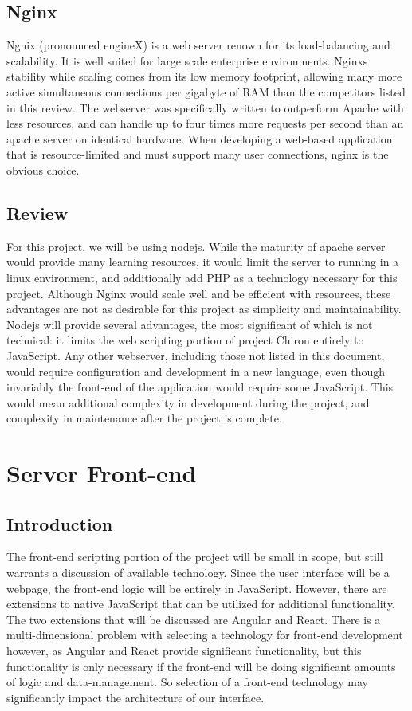 \documentclass[onecolumn, draftclsnofoot,10pt, compsoc]{report}
\begin{document}
\subsection{Nginx}
Ngnix (pronounced engineX) is a web server renown for its load-balancing and scalability. It is well suited for large
scale enterprise environments. Nginxs stability while scaling comes from its low memory footprint, allowing many
more active simultaneous connections per gigabyte of RAM than the competitors listed in this review. The webserver
was specifically written to outperform Apache with less resources, and can handle up to four times more requests per
second than an apache server on identical hardware. When developing a web-based application that is resource-limited
and must support many user connections, nginx is the obvious choice.
\subsection{Review}
For this project, we will be using nodejs. While the maturity of apache server would provide many learning resources,
it would limit the server to running in a linux environment, and additionally add PHP as a technology necessary for
this project. Although Nginx would scale well and be efficient with resources, these advantages are not as desirable for
this project as simplicity and maintainability. Nodejs will provide several advantages, the most significant of which is
not technical: it limits the web scripting portion of project Chiron entirely to JavaScript. Any other webserver, including
those not listed in this document, would require configuration and development in a new language, even though
invariably the front-end of the application would require some JavaScript. This would mean additional complexity in
development during the project, and complexity in maintenance after the project is complete.


\section{Server Front-end}
\subsection{Introduction}
The front-end scripting portion of the project will be small in scope, but still warrants a discussion of available
technology. Since the user interface will be a webpage, the front-end logic will be entirely in JavaScript. However,
there are extensions to native JavaScript that can be utilized for additional functionality. The two extensions that will
be discussed are Angular and React. There is a multi-dimensional problem with selecting a technology for front-end
development however, as Angular and React provide significant functionality, but this functionality is only necessary if
the front-end will be doing significant amounts of logic and data-management. So selection of a front-end technology
may significantly impact the architecture of our interface.
\end{document}
